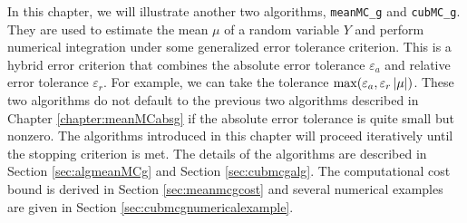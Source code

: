 \documentclass{iitthesis}
\theoremstyle{definition}
\begin{document}
%
%

 \label{chapter:meanMCg}

In this chapter, we will illustrate another two algorithms, {\tt meanMC\_g} and {\tt cubMC\_g}. They are used to estimate the mean $\mu$ of a random variable $Y$ and perform numerical integration under some generalized error tolerance criterion. This is a hybrid error criterion that combines the absolute error tolerance $\varepsilon_a$ and relative error tolerance $\varepsilon_r$. For example, we can take the tolerance $\max(\varepsilon_a, \varepsilon_r \left \lvert \mu \right \rvert)$. These two algorithms do not default to the previous two algorithms described in Chapter \ref{chapter:meanMCabsg} if the absolute error tolerance is quite small but nonzero. The algorithms introduced in this chapter will proceed iteratively until the stopping criterion is met. The details of the algorithms are described in Section \ref{sec:algmeanMCg} and Section \ref{sec:cubmcgalg}. The computational cost bound is derived in Section \ref{sec:meanmcgcost} and several numerical examples are given in Section \ref{sec:cubmcgnumericalexample}.

\label{sec:generalerrorcriterion}
\end{document}
